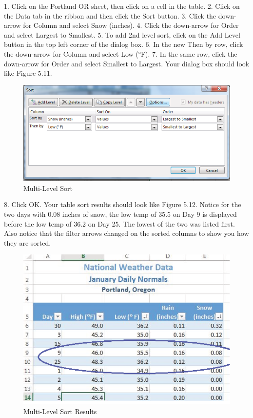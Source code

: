 1.   Click on the Portland OR sheet, then click on a cell in the table.
2.   Click on the Data tab in the ribbon and then click the Sort button.
3.   Click the down-arrow for Column and select Snow (inches).
4.   Click the down-arrow for Order and select Largest to Smallest.
5.   To add 2nd level sort, click on the Add Level button in the top left corner of the dialog box.
6.   In the new Then by row, click the down-arrow for Column and select Low (°F).
7.   In the same row, click the down-arrow for Order and select Smallest to Largest. Your dialog box
should look like Figure 5.11.

\begin{figure}[H]
	\centering
	\includegraphics[width=\maxwidth{.95\linewidth}]{gfx/ch05_fig11}
	\caption{Multi-Level Sort}
	\label{05:fig11}
\end{figure}






8. Click OK. Your table sort results should look like Figure 5.12. Notice for the two days with 0.08
inches of snow, the low temp of 35.5 on Day 9 is displayed before the low temp of 36.2 on Day
25. The lowest of the two was listed first. Also notice that the filter arrows changed on the
sorted columns to show you how they are sorted.


\begin{figure}[H]
	\centering
	\includegraphics[width=\maxwidth{.95\linewidth}]{gfx/ch05_fig12}
	\caption{Multi-Level Sort Results}
	\label{05:fig12}
\end{figure}






